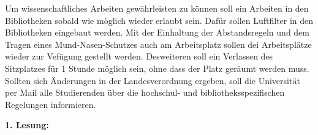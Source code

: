 {{            Um wissenschaftliches Arbeiten gewährleisten zu können soll ein Arbeiten in den Bibliotheken sobald wie möglich wieder erlaubt sein. Dafür sollen Luftfilter in den Bibliotheken eingebaut werden. Mit der Einhaltung der Abstandsregeln und dem Tragen eines Mund-Nasen-Schutzes auch am Arbeitsplatz sollen dei Arbeitsplätze wieder zur Vefügung gestellt werden. Desweiteren soll ein Verlassen des Sitzplatzes für 1 Stunde möglich sein, ohne dass der Platz geräumt werden muss.\\
            Sollten sich Änderungen in der Landesverordnung ergeben, soll die Universität per Mail alle Studierenden über die hochschul- und bibliotheksspezifischen Regelungen informieren.
        }
    }{

    }{
        \textbf{1. Lesung:}
        \ul{}
    }{
    }
